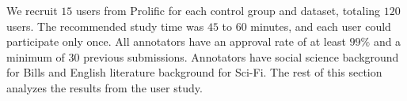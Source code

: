 \begin{table*}[t]
{    }
    \label{tab:cluster_metrics}
\end{table*}


We recruit \(15\) users from Prolific for each control group and dataset, totaling \(120\) users. 
%
The recommended study time was \(45\) to \(60\) minutes, and each user could participate only once.
%
%
All annotators have an approval rate of at least $99\%$ and a minimum of \(30\) previous submissions.
%
Annotators have social science background for Bills and English literature background for Sci-Fi.
%
%
%
%
The rest of this section analyzes the results from the user study.

